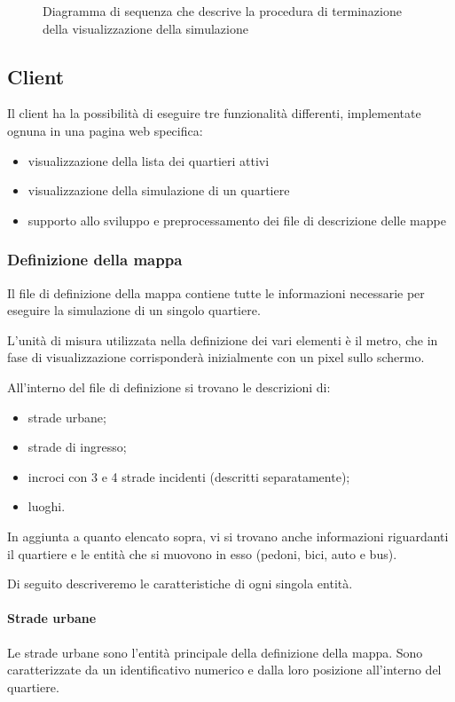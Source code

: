 \begin{figure}[H] %
\caption{Diagramma di sequenza che descrive la procedura di terminazione della
visualizzazione della simulazione}
\label{fig:stopwebserver}
\end{figure}

\subsection{Client}
Il client ha la possibilità di eseguire tre funzionalità differenti,
implementate ognuna in una pagina web specifica:
\begin{itemize}
	\item visualizzazione della lista dei quartieri attivi
	\item visualizzazione della simulazione di un quartiere
	\item supporto allo sviluppo e preprocessamento dei file di descrizione delle
	mappe
\end{itemize}

\subsubsection{Definizione della mappa}
Il file di definizione della mappa contiene tutte le informazioni necessarie per
eseguire la simulazione di un singolo quartiere. 

L'unità di misura utilizzata nella definizione dei vari elementi è il metro, che
in fase di visualizzazione corrisponderà inizialmente con un pixel sullo
schermo.

All'interno del file di definizione si trovano le descrizioni di:
\begin{itemize}
	\item strade urbane;
	\item strade di ingresso;
	\item incroci con 3 e 4 strade incidenti (descritti separatamente);
	\item luoghi.
\end{itemize}

In aggiunta a quanto elencato sopra, vi si trovano anche informazioni
riguardanti il quartiere e le entità che si muovono in esso (pedoni, bici, auto
e bus).

Di seguito descriveremo le caratteristiche di ogni singola entità.

\paragraph*{Strade urbane}
Le strade urbane sono l'entità principale della definizione della mappa. Sono
caratterizzate da un identificativo numerico e dalla loro posizione all'interno
del quartiere. 

